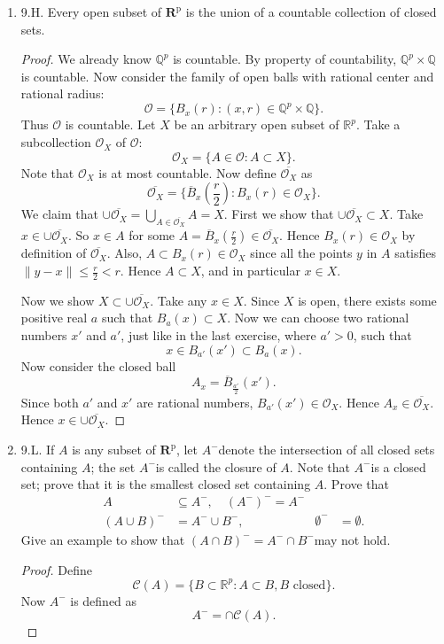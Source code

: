 \begin{enumerate}
\begin{proof}
\end{proof}


\item 9.H. Every open subset of $\boldsymbol{R}^{\mathrm{p}}$ is the union of a countable collection of closed sets.
\begin{proof}
	We already know $\mathbb{Q}^p$ is countable. By property of countability, $\mathbb{Q}^p \times \mathbb{Q}$ is countable. Now consider the family of open balls with rational center and rational radius:
	\[
		\mathcal{O} = \{B_x(r):(x,r) \in \mathbb{Q}^p \times \mathbb{Q}\}
	.\] 
	Thus $\mathcal{O}$ is countable. Let $X$ be an arbitrary open subset of $\mathbb{R}^p$. Take a subcollection $\mathcal{O}_X$ of $\mathcal{O}$: \[
		\mathcal{O}_X = \{A \in \mathcal{O}: A \subset X\} 
	.\] Note that $\mathcal{O}_X$ is at most countable.
	Now define $\overline{\mathcal{O}_X}$ as
	\[
		 \overline{\mathcal{O}_X}= \{\overline{B}_x(\frac{r}{2}): B_x(r) \in \mathcal{O}_X\} 
	.\] 
	We claim that $\cup  \overline{\mathcal{O}_X} = \bigcup_{A \in \overline{\mathcal{O}_X} } A= X$. First we show that $\cup \overline{\mathcal{O}_X} \subset  X$. Take $x \in \cup \overline{\mathcal{O}_X}$. So $x \in A$ for some $A = \overline{B}_x(\frac{r}{2}) \in \overline{\mathcal{O}_X}$. Hence $B_x(r) \in \mathcal{O}_X$ by definition of $\overline{\mathcal{O}_X}$.
Also, $A \subset  B_x(r) \in \mathcal{O}_X$ since all the points $y$ in $A$ satisfies $\|y-x\|\le \frac{r}{2} < r$.
Hence  $A \subset X$, and in particular $x \in X$.

	Now we show $ X \subset \cup \overline{\mathcal{O}_X}$. Take any $x \in X$. Since $X$ is open, there exists some positive real $a$ such that $B_a(x) \subset X$. Now we can choose two rational numbers $x'$ and $a'$, just like in the last exercise, where $a'>0$, such that 
		\[
		x \in B_{a'}(x') \subset B_a(x)
		.\] 
	Now consider the closed ball \[
		A_x = \overline{B} _{\frac{a'}{2}}(x')
	.\] 
	Since both $a'$ and $x'$ are rational numbers, $B_{a'}(x') \in \mathcal{O}_X$. Hence $A_x \in \overline{\mathcal{O}_X}$. Hence $x \in \cup  \overline{\mathcal{O}_X}$.
\end{proof}

	
\item 9.L. If $A$ is any subset of $\boldsymbol{R}^{\mathrm{p}}$, let $A^{-}$denote the intersection of all closed sets containing $A$; the set $A^{-}$is called the closure of $A$. Note that $A^{-}$is a closed set; prove that it is the smallest closed set containing $A$. Prove that
\[
\begin{aligned}
A & \subseteq A^{-}, \quad\left(A^{-}\right)^{-}=A^{-} \\
(A \cup B)^{-} &=A^{-} \cup B^{-}, & \emptyset^{-} &=\emptyset .
\end{aligned}
\]
Give an example to show that $(A \cap B)^{-}=A^{-} \cap B^{-}$may not hold.
\begin{proof}
	Define \[
			\mathcal{C}(A) = \{B\subset \mathbb{R}^p: A\subset B, B \text{ closed}\} 
		.\] 
		Now $A^-$ is defined as \[
			A^- = \cap \mathcal{C}(A) 
		.\] 


\end{proof}
\end{enumerate}
